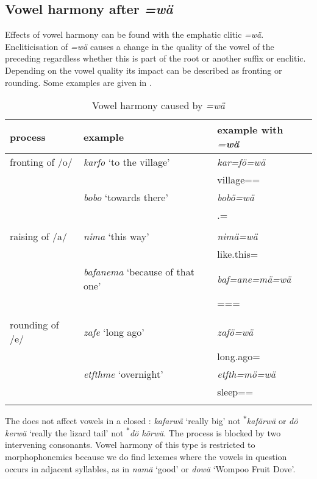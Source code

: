 \subsection{Vowel harmony after \emph{=wä}} \label{vowharmwae}

Effects of vowel harmony can be found with the emphatic clitic \emph{=wä}. Encliticisation of \emph{=wä} causes a change in the quality of the vowel of the preceding  regardless whether this  is part of the root or another suffix or enclitic. Depending on the vowel quality its impact can be described as fronting or rounding. Some examples are given in .

\begin{table}
\caption{Vowel harmony caused by \emph{=wä}}
\label{vowelharmwae}
	\begin{tabularx}{\textwidth}{Xll}
		\lsptoprule
		 {process}&{example}& {example with} \emph{=wä} \\ \midrule
		fronting of /o/&\emph{karfo} `to the village' & \emph{kar=fö=wä} \\
		&&village={\Abl}={\Emph}\\
		&\emph{bobo} `towards there' & \emph{bobö=wä}\\
		&&\Med{}.{\All}={\Emph}\\
		&&\\
		raising of /a/&\emph{nima} `this way' & \emph{nimä=wä}\\
		&&like.this={\Emph}\\
		&\emph{bafanema} `because of that one' & \emph{baf=ane=mä=wä}\\
		&&\Recog=\Poss=\Char={\Emph}\\
		&&\\
		rounding of /e/&\emph{zafe} `long ago' & \emph{zafö=wä}\\
		&&long.ago=\Emph\\
		&\emph{etfthme} `overnight' & \emph{etfth=mö=wä}\\
		&&sleep=\Ins=\Emph\\
		\lspbottomrule
	\end{tabularx}
\end{table}	%

The  does not affect vowels in a closed : \emph{kafarwä} `really big' not \textsuperscript{$\ast$}\emph{kafärwä} or \emph{dö kerwä} `really the lizard tail' not \textsuperscript{$\ast$}\emph{dö körwä}. The process is blocked by two intervening consonants. Vowel harmony of this type is restricted to morphophonemics because we do find lexemes where the vowels in question occurs in adjacent syllables, as in \emph{namä} `good' or \emph{dowä} `Wompoo Fruit Dove'.

